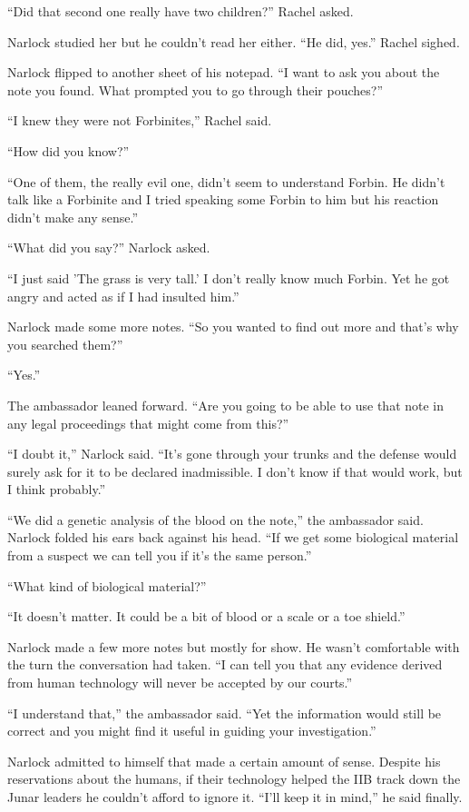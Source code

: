 ``Did that second one really have two children?'' Rachel asked.

Narlock studied her but he couldn't read her either. ``He did, yes.'' Rachel sighed.

Narlock flipped to another sheet of his notepad. ``I want to ask you about the note you found.
What prompted you to go through their pouches?''

``I knew they were not Forbinites,'' Rachel said.

``How did you know?''

``One of them, the really evil one, didn't seem to understand Forbin. He didn't talk like a
Forbinite and I tried speaking some Forbin to him but his reaction didn't make any sense.''

``What did you say?'' Narlock asked.

``I just said 'The grass is very tall.' I don't really know much Forbin. Yet he got angry and
acted as if I had insulted him.''

Narlock made some more notes. ``So you wanted to find out more and that's why you searched
them?''

``Yes.''

The ambassador leaned forward. ``Are you going to be able to use that note in any legal
proceedings that might come from this?''

``I doubt it,'' Narlock said. ``It's gone through your trunks and the defense would surely ask
for it to be declared inadmissible. I don't know if that would work, but I think probably.''

``We did a genetic analysis of the blood on the note,'' the ambassador said. Narlock folded his
ears back against his head. ``If we get some biological material from a suspect we can tell you
if it's the same person.''

``What kind of biological material?''

``It doesn't matter. It could be a bit of blood or a scale or a toe shield.''

Narlock made a few more notes but mostly for show. He wasn't comfortable with the turn the
conversation had taken. ``I can tell you that any evidence derived from human technology will
never be accepted by our courts.''

``I understand that,'' the ambassador said. ``Yet the information would still be correct and you
might find it useful in guiding your investigation.''

Narlock admitted to himself that made a certain amount of sense. Despite his reservations about
the humans, if their technology helped the IIB track down the Junar leaders he couldn't afford
to ignore it. ``I'll keep it in mind,'' he said finally.

